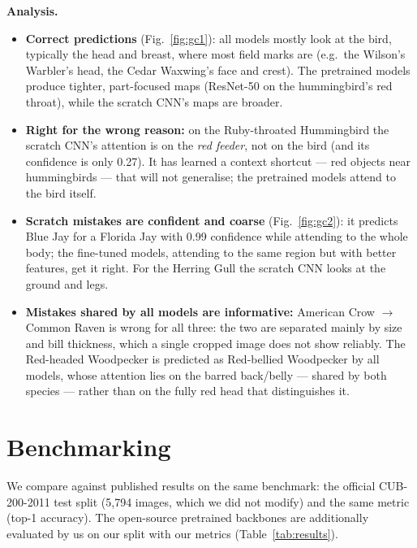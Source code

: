 \documentclass[11pt,a4paper]{article}
\begin{document}
\textbf{Analysis.}
\begin{itemize}
\item \textbf{Correct predictions} (Fig.~\ref{fig:gc1}): all models mostly look at the bird, typically the head and breast,
where most field marks are (e.g.\ the Wilson's Warbler's head, the Cedar Waxwing's face and crest).
The pretrained models produce tighter, part-focused maps (ResNet-50 on the hummingbird's red throat), while the scratch
CNN's maps are broader.
\item \textbf{Right for the wrong reason:} on the Ruby-throated Hummingbird the scratch CNN's attention is on the
\emph{red feeder}, not on the bird (and its confidence is only 0.27). It has learned a context shortcut --- red objects near
hummingbirds --- that will not generalise; the pretrained models attend to the bird itself.
\item \textbf{Scratch mistakes are confident and coarse} (Fig.~\ref{fig:gc2}): it predicts Blue Jay for a Florida Jay with 0.99
confidence while attending to the whole body; the fine-tuned models, attending to the same region but with better features,
get it right. For the Herring Gull the scratch CNN looks at the ground and legs.
\item \textbf{Mistakes shared by all models are informative:} American Crow $\rightarrow$ Common Raven is wrong for all three:
the two are separated mainly by size and bill thickness, which a single cropped image does not show reliably. The
Red-headed Woodpecker is predicted as Red-bellied Woodpecker by all models, whose attention lies on the barred back/belly
--- shared by both species --- rather than on the fully red head that distinguishes it.
\end{itemize}

\section{Benchmarking}\label{sec:bench}
We compare against published results on the same benchmark: the official CUB-200-2011 test split (5,794 images, which we did
not modify) and the same metric (top-1 accuracy). The open-source pretrained backbones are additionally evaluated by us on
our split with our metrics (Table~\ref{tab:results}).
\end{document}
